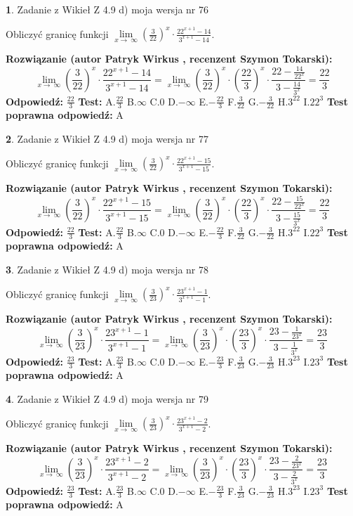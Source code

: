 \documentclass[12pt, a4paper]{article}
\theoremstyle{definition} %
\newtheorem{zad}{}
\newcommand{\zadStart}[1]{\begin{zad}#1\newline}
\newcommand{\zadStop}{\end{zad}}
\newcommand{\rozwStart}[2]{\noindent \textbf{Rozwiązanie (autor #1 , recenzent #2): }\newline}
\newcommand{\rozwStop}{\newline}
\newcommand{\odpStart}{\noindent \textbf{Odpowiedź:}\newline}
\newcommand{\odpStop}{\newline}
\newcommand{\testStart}{\noindent \textbf{Test:}\newline}
\newcommand{\testStop}{\newline}
\newcommand{\kluczStart}{\noindent \textbf{Test poprawna odpowiedź:}\newline}
\newcommand{\kluczStop}{\newline}
\begin{document}
\zadStart{Zadanie z Wikieł Z 4.9 d) moja wersja nr 76}


Obliczyć granicę funkcji  $\lim\limits_{x\to\ \infty}(\frac{3}{22})^{x}\cdot\frac{22^{x+1}-14}{3^{x+1}-14}$.
\zadStop
\rozwStart{Patryk Wirkus}{Szymon Tokarski}
$$\lim\limits_{x\to\ \infty}(\frac{3}{22})^{x}\cdot\frac{22^{x+1}-14}{3^{x+1}-14}=\lim\limits_{x\to\ \infty}(\frac{3}{22})^{x}\cdot(\frac{22}{3})^{x} \cdot \frac{22-\frac{14}{22^{x}}}{3-\frac{14}{3^{x}}} = \frac{22}{3}$$
\rozwStop
\odpStart
$\frac{22}{3}$
\odpStop
\testStart
A.$\frac{22}{3}$ B.$\infty$ C.$0$ D.$-\infty$ E.$-\frac{22}{3}$
F.$\frac{3}{22}$ G.$-\frac{3}{22}$
H.$3^{22}$
I.$22^{3}$
\testStop
\kluczStart
A
\kluczStop



\zadStart{Zadanie z Wikieł Z 4.9 d) moja wersja nr 77}


Obliczyć granicę funkcji  $\lim\limits_{x\to\ \infty}(\frac{3}{22})^{x}\cdot\frac{22^{x+1}-15}{3^{x+1}-15}$.
\zadStop
\rozwStart{Patryk Wirkus}{Szymon Tokarski}
$$\lim\limits_{x\to\ \infty}(\frac{3}{22})^{x}\cdot\frac{22^{x+1}-15}{3^{x+1}-15}=\lim\limits_{x\to\ \infty}(\frac{3}{22})^{x}\cdot(\frac{22}{3})^{x} \cdot \frac{22-\frac{15}{22^{x}}}{3-\frac{15}{3^{x}}} = \frac{22}{3}$$
\rozwStop
\odpStart
$\frac{22}{3}$
\odpStop
\testStart
A.$\frac{22}{3}$ B.$\infty$ C.$0$ D.$-\infty$ E.$-\frac{22}{3}$
F.$\frac{3}{22}$ G.$-\frac{3}{22}$
H.$3^{22}$
I.$22^{3}$
\testStop
\kluczStart
A
\kluczStop



\zadStart{Zadanie z Wikieł Z 4.9 d) moja wersja nr 78}


Obliczyć granicę funkcji  $\lim\limits_{x\to\ \infty}(\frac{3}{23})^{x}\cdot\frac{23^{x+1}-1}{3^{x+1}-1}$.
\zadStop
\rozwStart{Patryk Wirkus}{Szymon Tokarski}
$$\lim\limits_{x\to\ \infty}(\frac{3}{23})^{x}\cdot\frac{23^{x+1}-1}{3^{x+1}-1}=\lim\limits_{x\to\ \infty}(\frac{3}{23})^{x}\cdot(\frac{23}{3})^{x} \cdot \frac{23-\frac{1}{23^{x}}}{3-\frac{1}{3^{x}}} = \frac{23}{3}$$
\rozwStop
\odpStart
$\frac{23}{3}$
\odpStop
\testStart
A.$\frac{23}{3}$ B.$\infty$ C.$0$ D.$-\infty$ E.$-\frac{23}{3}$
F.$\frac{3}{23}$ G.$-\frac{3}{23}$
H.$3^{23}$
I.$23^{3}$
\testStop
\kluczStart
A
\kluczStop



\zadStart{Zadanie z Wikieł Z 4.9 d) moja wersja nr 79}


Obliczyć granicę funkcji  $\lim\limits_{x\to\ \infty}(\frac{3}{23})^{x}\cdot\frac{23^{x+1}-2}{3^{x+1}-2}$.
\zadStop
\rozwStart{Patryk Wirkus}{Szymon Tokarski}
$$\lim\limits_{x\to\ \infty}(\frac{3}{23})^{x}\cdot\frac{23^{x+1}-2}{3^{x+1}-2}=\lim\limits_{x\to\ \infty}(\frac{3}{23})^{x}\cdot(\frac{23}{3})^{x} \cdot \frac{23-\frac{2}{23^{x}}}{3-\frac{2}{3^{x}}} = \frac{23}{3}$$
\rozwStop
\odpStart
$\frac{23}{3}$
\odpStop
\testStart
A.$\frac{23}{3}$ B.$\infty$ C.$0$ D.$-\infty$ E.$-\frac{23}{3}$
F.$\frac{3}{23}$ G.$-\frac{3}{23}$
H.$3^{23}$
I.$23^{3}$
\testStop
\kluczStart
A
\kluczStop
\end{document}
